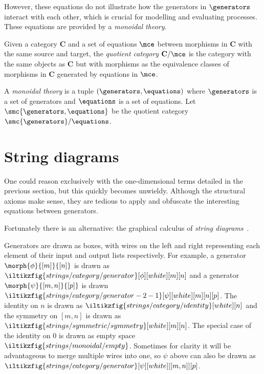 However, these equations do not illustrate how the generators in \(\generators\)
interact with each other, which is crucial for modelling and evaluating
processes.
These equations are provided by a \emph{monoidal theory}.

\begin{definition}
    Given a category \(\mathbf{C}\) and a set of equations \(\mce\) between
    morphisms in \(\mathbf{C}\) with the same source and target, the
    \emph{quotient category} \(\mathbf{C} / \mce\) is the category with the same
    objects as \(\mathbf{C}\) but with morphisms as the equivalence classes
    of morphisms in \(\mathbf{C}\) generated by equations in \(\mce\).
\end{definition}

\begin{definition}
    A \emph{monoidal theory} is a tuple \((\generators, \equations)\) where
    \(\generators\) is a set of generators and \(\equations\) is a set of
    equations.
    Let \(\smc{\generators,\equations}\) be the quotient category
    \(\smc{\generators} / \equations\).
\end{definition}

\section{String diagrams}

One could reason exclusively with the one-dimensional terms detailed in the
previous section, but this quickly becomes unwieldy.
Although the structural axioms make sense, they are tedious to apply and
obfuscate the interesting equations between generators.

Fortunately there is an alternative: the graphical calculus of
\emph{string diagrams}~\cite{joyal1991geometry}.


Generators are drawn as boxes, with wires on the left and right representing
each element of their input and output lists respectively.
For example, a generator \(\morph{\phi}{[m]}{[n]}\) is drawn as \(
    \iltikzfig{strings/category/generator}[\phi][white][m][n]
\) and a generator \(\morph{\psi}{[m,n]}{[p]}\) is drawn \(
    \iltikzfig{strings/category/generator-2-1}[\psi][white][m][n][p]
\).
The identity on \(n\) is drawn as \(
    \iltikzfig{strings/category/identity}[white][n]
\) and the symmetry on \([m, n]\) is drawn as \(
    \iltikzfig{strings/symmetric/symmetry}[white][m][n]
\).
The special case of the identity on \(0\) is drawn as empty space \(
    \iltikzfig{strings/monoidal/empty}
\).
Sometimes for clarity it will be advantageous to merge multiple wires into one,
so \(\psi\) above can also be drawn as \(
    \iltikzfig{strings/category/generator}[\psi][white][[m,n]][p]
\).

